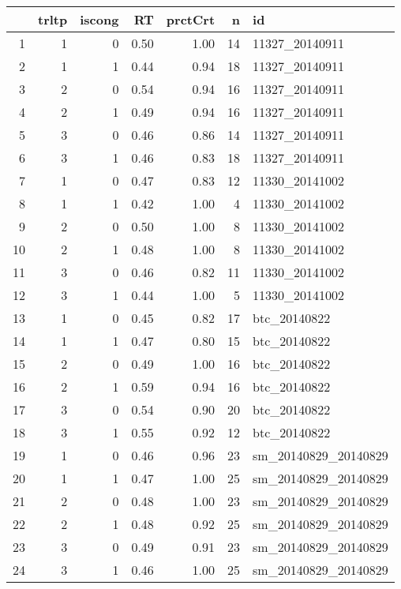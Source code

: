 \begin{tiny}
\begin{table}[ht]
\centering
\begin{tabular}{rrrrrrl}
  \hline
 & trltp & iscong & RT & prctCrt & n & id \\ 
  \hline
1 &   1 &   0 & 0.50 & 1.00 &  14 & 11327\_20140911 \\ 
  2 &   1 &   1 & 0.44 & 0.94 &  18 & 11327\_20140911 \\ 
  3 &   2 &   0 & 0.54 & 0.94 &  16 & 11327\_20140911 \\ 
  4 &   2 &   1 & 0.49 & 0.94 &  16 & 11327\_20140911 \\ 
  5 &   3 &   0 & 0.46 & 0.86 &  14 & 11327\_20140911 \\ 
  6 &   3 &   1 & 0.46 & 0.83 &  18 & 11327\_20140911 \\ 
  7 &   1 &   0 & 0.47 & 0.83 &  12 & 11330\_20141002 \\ 
  8 &   1 &   1 & 0.42 & 1.00 &   4 & 11330\_20141002 \\ 
  9 &   2 &   0 & 0.50 & 1.00 &   8 & 11330\_20141002 \\ 
  10 &   2 &   1 & 0.48 & 1.00 &   8 & 11330\_20141002 \\ 
  11 &   3 &   0 & 0.46 & 0.82 &  11 & 11330\_20141002 \\ 
  12 &   3 &   1 & 0.44 & 1.00 &   5 & 11330\_20141002 \\ 
  13 &   1 &   0 & 0.45 & 0.82 &  17 & btc\_20140822 \\ 
  14 &   1 &   1 & 0.47 & 0.80 &  15 & btc\_20140822 \\ 
  15 &   2 &   0 & 0.49 & 1.00 &  16 & btc\_20140822 \\ 
  16 &   2 &   1 & 0.59 & 0.94 &  16 & btc\_20140822 \\ 
  17 &   3 &   0 & 0.54 & 0.90 &  20 & btc\_20140822 \\ 
  18 &   3 &   1 & 0.55 & 0.92 &  12 & btc\_20140822 \\ 
  19 &   1 &   0 & 0.46 & 0.96 &  23 & sm\_20140829\_20140829 \\ 
  20 &   1 &   1 & 0.47 & 1.00 &  25 & sm\_20140829\_20140829 \\ 
  21 &   2 &   0 & 0.48 & 1.00 &  23 & sm\_20140829\_20140829 \\ 
  22 &   2 &   1 & 0.48 & 0.92 &  25 & sm\_20140829\_20140829 \\ 
  23 &   3 &   0 & 0.49 & 0.91 &  23 & sm\_20140829\_20140829 \\ 
  24 &   3 &   1 & 0.46 & 1.00 &  25 & sm\_20140829\_20140829 \\ 
   \hline
\end{tabular}
\end{table}
\end{tiny}
